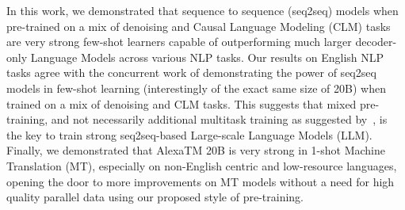 In this work, we demonstrated that sequence to sequence (seq2seq) models when pre-trained on a mix of denoising and Causal Language Modeling (CLM) tasks are very strong few-shot learners capable of outperforming much larger decoder-only Language Models across various NLP tasks. Our results on English NLP tasks agree with the concurrent work of \cite{Tay2022UnifyingLL} demonstrating the power of seq2seq models in few-shot learning (interestingly of the exact same size of 20B) when trained on a mix of denoising and CLM tasks. This suggests that mixed pre-training, and not necessarily additional multitask training as suggested by~\cite{Wang2022WhatLM}, is the key to train strong seq2seq-based Large-scale Language Models (LLM). Finally, we demonstrated that {AlexaTM 20B} is very strong in 1-shot Machine Translation (MT), especially on non-English centric and low-resource languages, opening the door to more improvements on MT models without a need for high quality parallel data using our proposed style of pre-training.

\pagebreak


